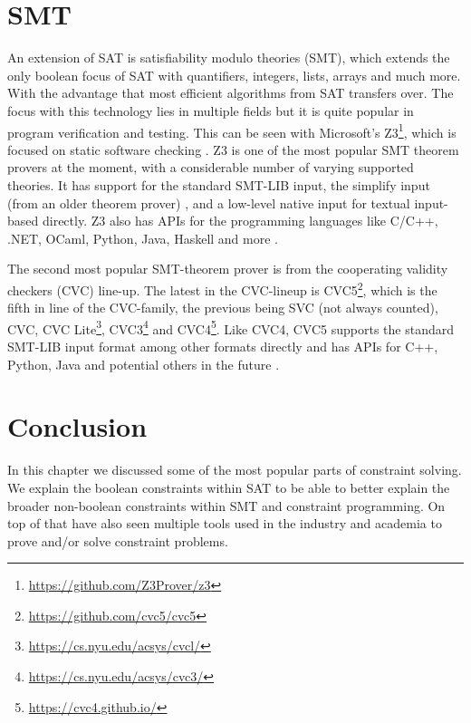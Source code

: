 

\section{SMT}
\label{CS:SMT}
An extension of SAT is satisfiability modulo theories (SMT), which extends the only boolean focus of SAT with quantifiers, integers, lists, arrays and much more. With the advantage that most efficient algorithms from SAT transfers over. The focus with this technology lies in multiple fields but it is quite popular in program verification and testing. This can be seen with Microsoft’s Z3\footnote{\url{https://github.com/Z3Prover/z3}}, which is focused on static software checking \cite{54moura2008z3}. Z3 is one of the most popular SMT theorem provers at the moment, with a considerable number of varying supported theories. It has support for the standard SMT-LIB input, the simplify input (from an older theorem prover) \cite{73detlefs2005simplify}, and a low-level native input for textual input-based directly. Z3 also has APIs for the programming languages like C/C++, .NET, OCaml, Python, Java, Haskell and more \cite{64WikiSMT}.

The second most popular SMT-theorem prover is from the cooperating validity checkers (CVC) line-up. The latest in the CVC-lineup is CVC5\footnote{\url{https://github.com/cvc5/cvc5}}, which is the fifth in line of the CVC-family, the previous being SVC (not always counted), CVC, 
CVC Lite\footnote{\url{https://cs.nyu.edu/acsys/cvcl/}}, 
CVC3\footnote{\url{https://cs.nyu.edu/acsys/cvc3/}}\cite{71barrett2007cvc3} and 
CVC4\footnote{\url{https://cvc4.github.io/}}.
Like CVC4, CVC5 supports the standard SMT-LIB input format among other formats directly and has APIs for C++, Python, Java and potential others in the future \cite{63barbosa2022cvc5, 62barrettcvc5}.

\section{Conclusion}
\label{CS:conclusion}
In this chapter we discussed some of the most popular parts of constraint solving. We explain the boolean constraints within SAT to be able to better explain the broader non-boolean constraints within SMT and constraint programming. On top of that have also seen multiple tools used in the industry and academia to prove and/or solve constraint problems.

